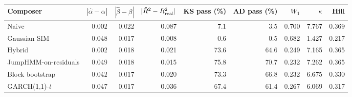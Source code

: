 \begin{tabular}{lrrrrrrrr}
\toprule
Composer & $|\hat\alpha-\alpha|$ & $|\hat\beta-\beta|$ & $|\hat R^2 - R^2_{\mathrm{real}}|$ & KS pass (\%) & AD pass (\%) & $W_1$ & $\kappa$ & Hill \\
\midrule
Naive & 0.002 & 0.022 & 0.087 & 7.1 & 3.5 & 0.700 & 7.767 & 0.369 \\
Gaussian SIM & 0.048 & 0.017 & 0.008 & 0.6 & 0.5 & 0.682 & 1.427 & 0.217 \\
Hybrid & 0.002 & 0.018 & 0.021 & 73.6 & 64.6 & 0.249 & 7.165 & 0.365 \\
JumpHMM-on-residuals & 0.049 & 0.018 & 0.015 & 75.8 & 70.7 & 0.232 & 7.262 & 0.365 \\
Block bootstrap & 0.042 & 0.017 & 0.020 & 73.3 & 66.8 & 0.232 & 6.675 & 0.330 \\
GARCH(1,1)-$t$ & 0.047 & 0.017 & 0.036 & 67.4 & 61.4 & 0.267 & 6.069 & 0.317 \\
\bottomrule
\end{tabular}

